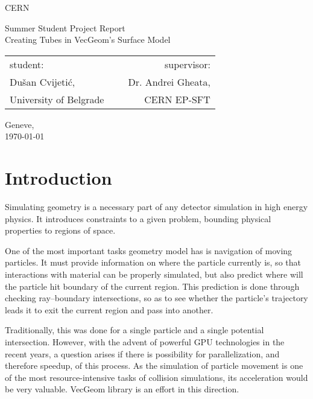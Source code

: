 \documentclass[12pt, a4paper]{article}
\begin{document}
	
\thispagestyle{empty}
{ \centering
	CERN
	\vspace*{0.5cm}
	
	\footnotesize
	Summer Student Project Report\\
	\huge
	{\sc Creating Tubes in VecGeom's Surface Model}\\
	\vspace{0.4cm}
	\footnotesize
	\begin{tabular}{l c r}
		student: & \hspace{3cm}\ & supervisor:\\
		Dušan Cvijetić\footnotemark, && Dr. Andrei Gheata, \\
		\scriptsize University of Belgrade && \scriptsize CERN EP-SFT
	\end{tabular}
	
	\normalsize
	\vspace{0.5cm}
	Geneve,\\
	\today
	\vspace{2cm}
		
	
}

\begin{abstract}
	\blindtext
\end{abstract}

\newpage
\tableofcontents

\section{Introduction}

Simulating geometry is a necessary part of any detector simulation in high energy physics. It introduces constraints to a given problem, bounding physical properties to regions of space.

One of the most important tasks geometry model has is navigation of moving particles. It must provide information on where the particle currently is, so that interactions with material can be properly simulated, but also predict where will the particle hit boundary of the current region. This prediction is done through checking ray--boundary intersections, so as to see whether the particle's trajectory leads it to exit the current region and pass into another.

Traditionally, this was done for a single particle and a single potential intersection. However, with the advent of powerful GPU technologies in the recent years, a question arises if there is possibility for parallelization, and therefore speedup, of this process. As the simulation of particle movement is one of the most resource-intensive tasks of collision simulations, its acceleration would be very valuable. VecGeom library is an effort in this direction.
\end{document}
